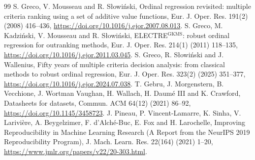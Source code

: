 \documentclass[preprint,11pt]{elsarticle}
\begin{document}
\begin{thebibliography}{99}
 S. Greco, V. Mousseau and R. S\l{}owi\'nski, Ordinal regression revisited: multiple criteria ranking using a set of additive value functions, Eur. J. Oper. Res. 191(2) (2008) 416--436, \url{https://doi.org/10.1016/j.ejor.2007.08.013}.
 S. Greco, M. Kadzi\'nski, V. Mousseau and R. S\l{}owi\'nski, ELECTRE$^{\mathrm{GKMS}}$: robust ordinal regression for outranking methods, Eur. J. Oper. Res. 214(1) (2011) 118--135, \url{https://doi.org/10.1016/j.ejor.2011.03.045}.
 S. Greco, R. S\l{}owi\'nski and J. Wallenius, Fifty years of multiple criteria decision analysis: from classical methods to robust ordinal regression, Eur. J. Oper. Res. 323(2) (2025) 351--377, \url{https://doi.org/10.1016/j.ejor.2024.07.038}.
 T. Gebru, J. Morgenstern, B. Vecchione, J. Wortman Vaughan, H. Wallach, H. Daum\'e III and K. Crawford, Datasheets for datasets, Commun. ACM 64(12) (2021) 86--92, \url{https://doi.org/10.1145/3458723}.
 J. Pineau, P. Vincent-Lamarre, K. Sinha, V. Larivi\`ere, A. Beygelzimer, F. d'Alch\'e-Buc, E. Fox and H. Larochelle, Improving Reproducibility in Machine Learning Research (A Report from the NeurIPS 2019 Reproducibility Program), J. Mach. Learn. Res. 22(164) (2021) 1--20, \url{https://www.jmlr.org/papers/v22/20-303.html}.
\end{thebibliography}
\end{document}
